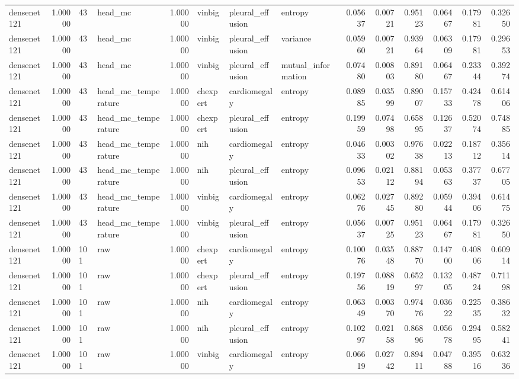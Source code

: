 \begin{tabular}{lrllrlllrrrrrr}
densenet121 & 1.00000 & 43 & head\_mc & 1.00000 & vinbig & pleural\_effusion & entropy & 0.05637 & 0.00721 & 0.95123 & 0.06467 & 0.17981 & 0.32650 \\
densenet121 & 1.00000 & 43 & head\_mc & 1.00000 & vinbig & pleural\_effusion & variance & 0.05960 & 0.00721 & 0.93964 & 0.06309 & 0.17981 & 0.29653 \\
densenet121 & 1.00000 & 43 & head\_mc & 1.00000 & vinbig & pleural\_effusion & mutual\_information & 0.07480 & 0.00803 & 0.89180 & 0.06467 & 0.23344 & 0.39274 \\
densenet121 & 1.00000 & 43 & head\_mc\_temperature & 1.00000 & chexpert & cardiomegaly & entropy & 0.08985 & 0.03599 & 0.89007 & 0.15733 & 0.42478 & 0.61406 \\
densenet121 & 1.00000 & 43 & head\_mc\_temperature & 1.00000 & chexpert & pleural\_effusion & entropy & 0.19959 & 0.07498 & 0.65895 & 0.12637 & 0.52074 & 0.74885 \\
densenet121 & 1.00000 & 43 & head\_mc\_temperature & 1.00000 & nih & cardiomegaly & entropy & 0.04633 & 0.00302 & 0.97638 & 0.02213 & 0.18712 & 0.35614 \\
densenet121 & 1.00000 & 43 & head\_mc\_temperature & 1.00000 & nih & pleural\_effusion & entropy & 0.09653 & 0.02112 & 0.88194 & 0.05363 & 0.37737 & 0.67705 \\
densenet121 & 1.00000 & 43 & head\_mc\_temperature & 1.00000 & vinbig & cardiomegaly & entropy & 0.06276 & 0.02745 & 0.89280 & 0.05944 & 0.39406 & 0.61475 \\
densenet121 & 1.00000 & 43 & head\_mc\_temperature & 1.00000 & vinbig & pleural\_effusion & entropy & 0.05637 & 0.00725 & 0.95123 & 0.06467 & 0.17981 & 0.32650 \\
densenet121 & 1.00000 & 101 & raw & 1.00000 & chexpert & cardiomegaly & entropy & 0.10076 & 0.03548 & 0.88770 & 0.14700 & 0.40806 & 0.60914 \\
densenet121 & 1.00000 & 101 & raw & 1.00000 & chexpert & pleural\_effusion & entropy & 0.19756 & 0.08819 & 0.65297 & 0.13205 & 0.48724 & 0.71198 \\
densenet121 & 1.00000 & 101 & raw & 1.00000 & nih & cardiomegaly & entropy & 0.06349 & 0.00370 & 0.97476 & 0.03622 & 0.22535 & 0.38632 \\
densenet121 & 1.00000 & 101 & raw & 1.00000 & nih & pleural\_effusion & entropy & 0.10297 & 0.02158 & 0.86896 & 0.05678 & 0.29495 & 0.58241 \\
densenet121 & 1.00000 & 101 & raw & 1.00000 & vinbig & cardiomegaly & entropy & 0.06619 & 0.02742 & 0.89411 & 0.04788 & 0.39516 & 0.63236 \\

\end{tabular}
